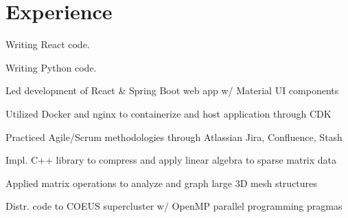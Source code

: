 \documentclass[letterpaper]{deedy-resume} %
\begin{document}
\begin{minipage}[t]{0.66\textwidth} %

\section{Experience}

\vspace{\topsep} %
\begin{tightitemize}
\item Writing React code.
\end{tightitemize}

\sectionspace %

\begin{tightitemize}
\item Writing Python code.
\end{tightitemize}

\sectionspace %

\begin{tightitemize}
  \item Led development of React \& Spring Boot web app w/ Material UI components
  \item Utilized Docker and nginx to containerize and host application through CDK
  \item Practiced Agile/Scrum methodologies through Atlassian Jira, Confluence, Stash
\end{tightitemize}

\sectionspace %

\begin{tightitemize}
  \item Impl. C++ library to compress and apply linear algebra to sparse matrix data
  \item Applied matrix operations to analyze and graph large 3D mesh structures
  \item Distr. code to COEUS supercluster w/ OpenMP parallel programming pragmas
\end{tightitemize}


\end{minipage}
\end{document}
